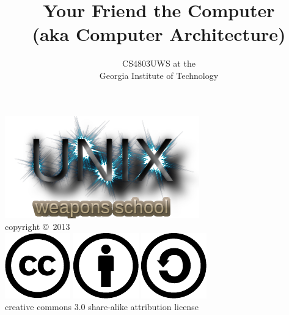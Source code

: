 \documentclass[mathserif,xcolor={dvipsnames,table}]{beamer}
\title{\textbf{Your Friend the Computer \\(aka Computer Architecture)}}
\date{}
\author{CS4803UWS at the\\
Georgia Institute of Technology
}
\begin{document}
\begin{frame}
\titlepage
\begin{center}
\includegraphics[scale=0.33]{images/uws.png}\\
\vspace{.1in}
\tiny{copyright \copyright\ 2013}\\
\includegraphics[scale=.25]{images/cc-logo.pdf}
\includegraphics[scale=.25]{images/cc-new.pdf}
\includegraphics[scale=.25]{images/cc-share.pdf}\\
\tiny{creative commons 3.0 share-alike attribution license}
\end{center}
\end{frame}
\end{document}
